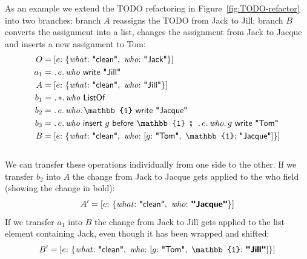 \documentclass[english,submission]{programming}
\theoremstyle{definition}
\newcommand{\mathbox}[1]{\colorbox{black!10}{$#1$\phantom{i\hspace{-3.5pt}}}}
\DeclareMathOperator{\exec}{\ \fatsemi\ \ }
\newcommand{\is}{{:}\ }
\newcommand{\comma}{,\ }
\newcommand{\quotedstring}[1]{\textsf{\textquotedbl{#1}\textquotedbl}}
\begin{document}
As an example we extend the TODO refactoring in Figure~\ref{fig:TODO-refactor} into two branches: branch \mathbox{A} reassigns the TODO from Jack to Jill; branch \mathbox{B} converts the assignment into a list, changes the assignment from Jack to Jacque and inserts a new assignment to Tom:
\begin{align*}
  O &= [
    e \is \{ \mathit{what}\is \quotedstring{clean}\comma  \mathit{who}\is \quotedstring{Jack} \}
    ] \\
  a_1 &= \ \ldotp e\ldotp\mathit{who}\textsf{ write } \quotedstring{Jill}\\
  A &= [
    e \is \{ \mathit{what}\is \quotedstring{clean}\comma  \mathit{who}\is \quotedstring{Jill} \}
    ] \\
  b_1 &= \ \ldotp *\ldotp \mathit{who} \textsf{ ListOf } \\
  b_2 &= \ \ldotp e\ldotp\mathit{who}\ldotp\mathbb{1} \textsf{ write } \quotedstring{Jacque} \\
  b_3 &= \ \ldotp e\ldotp\mathit{who} \textsf{ insert } g \textsf{ before } \mathbb{1} \exec \ldotp e\ldotp\mathit{who}\ldotp g \textsf{ write } \quotedstring{Tom} \\
  B &= [
    e \is \{ \mathit{what}\is \quotedstring{clean}\comma  \mathit{who}\is
    [ g \is \quotedstring{Tom} \comma \mathbb{1}\is \quotedstring{Jacque}] \}
    ] \\
  \end{align*}
  \vspace{-30pt}\\
We can transfer these operations individually from one side to the other.
If we transfer \mathbox{b_2} into \mathbox{A} the change from Jack to Jacque gets applied to the \textsf{who} field (showing the change in bold):
\[A' = [e \is \{ \mathit{what}\is \quotedstring{clean}\comma  \mathit{who}\is \textbf{\quotedstring{Jacque}} \}]\]
If we transfer \mathbox{a_1} into \mathbox{B} the change from Jack to Jill gets applied to the list element containing Jack, even though it has been wrapped and shifted:\\
\[B' = [
    e \is \{ \mathit{what}\is \quotedstring{clean}\comma  \mathit{who}\is
    [ g \is \quotedstring{Tom} \comma \mathbb{1}\is \textbf{\quotedstring{Jill}}] \}
]\]

\end{document}

